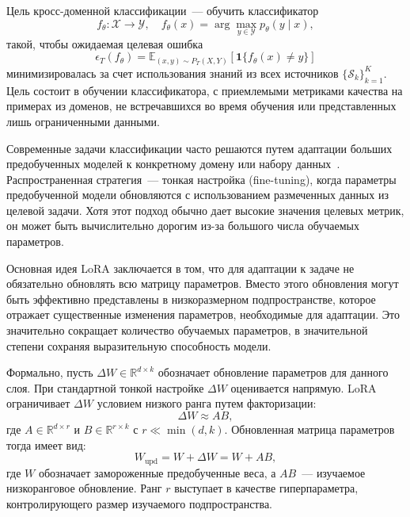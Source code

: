 Цель кросс-доменной классификации~--- обучить классификатор
\begin{equation}
    f_\theta : \mathcal{X} \to \mathcal{Y}, \quad f_\theta(x) = \arg\max_{y \in \mathcal{Y}} p_\theta(y \mid x),
\end{equation}
такой, чтобы ожидаемая целевая ошибка
\begin{equation}
    \epsilon_T(f_\theta) = \mathbb{E}_{(x,y) \sim P_T(X,Y)} [\mathbf{1}\{f_\theta(x) \neq y\}]
\end{equation}
минимизировалась за счет использования знаний из всех источников $\{\mathcal{S}_k\}_{k=1}^K$.
Цель состоит в обучении классификатора, с приемлемыми метриками качества на примерах из доменов, не встречавшихся во время обучения или представленных лишь ограниченными данными.

Современные задачи классификации часто решаются путем адаптации больших предобученных моделей к конкретному домену или набору данных~\cite{devlin2019bert}.
Распространенная стратегия~--- тонкая настройка (fine-tuning), когда параметры предобученной модели обновляются с использованием размеченных данных из целевой задачи.
Хотя этот подход обычно дает высокие значения целевых метрик, он может быть вычислительно дорогим из-за большого числа обучаемых параметров.

Основная идея LoRA заключается в том, что для адаптации к задаче не обязательно обновлять всю матрицу параметров.
Вместо этого обновления могут быть эффективно представлены в низкоразмерном подпространстве, которое отражает существенные изменения параметров, необходимые для адаптации.
Это значительно сокращает количество обучаемых параметров, в значительной степени сохраняя выразительную способность модели.

Формально, пусть $\Delta W \in \mathbb{R}^{d \times k}$ обозначает обновление параметров для данного слоя.
При стандартной тонкой настройке $\Delta W$ оценивается напрямую.
LoRA ограничивает $\Delta W$ условием низкого ранга путем факторизации:
\begin{equation}
    \Delta W \approx A B,
\end{equation}
где $A \in \mathbb{R}^{d \times r}$ и $B \in \mathbb{R}^{r \times k}$ с $r \ll \min(d,k)$.
Обновленная матрица параметров тогда имеет вид:
\begin{equation}
    W_{\text{upd}} = W + \Delta W = W + AB,
\end{equation}
где $W$ обозначает замороженные предобученные веса, а $AB$~--- изучаемое низкоранговое обновление.
Ранг $r$ выступает в качестве гиперпараметра, контролирующего размер изучаемого подпространства.

